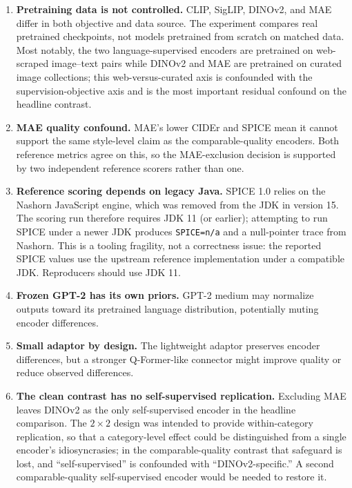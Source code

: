\documentclass[11pt]{article}
\newcommand{\code}[1]{\texttt{#1}}
\begin{document}
\begin{enumerate}
  \item \textbf{Pretraining data is not controlled.} CLIP, SigLIP, DINOv2, and
  MAE differ in both objective and data source. The experiment compares real
  pretrained checkpoints, not models pretrained from scratch on matched data.
  Most notably, the two language-supervised encoders are pretrained on
  web-scraped image--text pairs while DINOv2 and MAE are pretrained on
  curated image collections; this web-versus-curated axis is confounded with
  the supervision-objective axis and is the most important residual confound
  on the headline contrast.
  \item \textbf{MAE quality confound.} MAE's lower CIDEr and SPICE mean it
  cannot support the same style-level claim as the comparable-quality
  encoders. Both reference metrics agree on this, so the MAE-exclusion
  decision is supported by two independent reference scorers rather than
  one.
  \item \textbf{Reference scoring depends on legacy Java.} SPICE 1.0 relies
  on the Nashorn JavaScript engine, which was removed from the JDK in
  version 15. The scoring run therefore requires JDK 11 (or earlier);
  attempting to run SPICE under a newer JDK produces \code{SPICE=n/a} and a
  null-pointer trace from Nashorn. This is a tooling fragility, not a
  correctness issue: the reported SPICE values use the upstream reference
  implementation under a compatible JDK. Reproducers should use JDK 11.
  \item \textbf{Frozen GPT-2 has its own priors.} GPT-2 medium may normalize
  outputs toward its pretrained language distribution, potentially muting
  encoder differences.
  \item \textbf{Small adaptor by design.} The lightweight adaptor preserves
  encoder differences, but a stronger Q-Former-like connector might improve
  quality or reduce observed differences.
  \item \textbf{The clean contrast has no self-supervised replication.}
  Excluding MAE leaves DINOv2 as the only self-supervised encoder in the
  headline comparison. The \(2\times2\) design was intended to provide
  within-category replication, so that a category-level effect could be
  distinguished from a single encoder's idiosyncrasies; in the
  comparable-quality contrast that safeguard is lost, and ``self-supervised''
  is confounded with ``DINOv2-specific.'' A second comparable-quality
  self-supervised encoder would be needed to restore it.
\end{enumerate}
\end{document}
